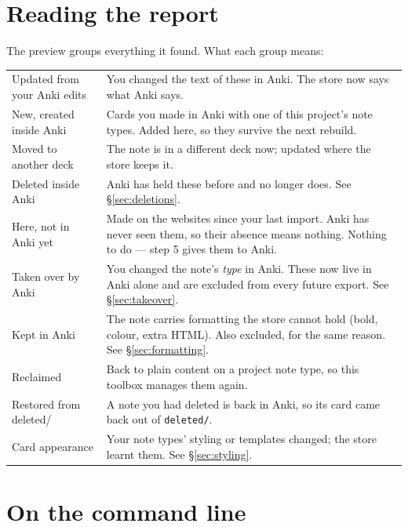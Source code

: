 \documentclass[11pt,oneside]{report}
\newcommand{\file}[1]{\texttt{#1}}
\begin{document}
\section{Reading the report}
\label{sec:report}

The preview groups everything it found. What each group means:

\begin{center}
\begin{longtable}{@{}p{}p{}@{}}
\toprule
\textsf{Updated from your Anki edits} & You changed the text of these in
  Anki. The store now says what Anki says. \\
\addlinespace
\textsf{New, created inside Anki} & Cards you made in Anki with one of this
  project's note types. Added here, so they survive the next rebuild. \\
\addlinespace
\textsf{Moved to another deck} & The note is in a different deck now;
  updated where the store keeps it. \\
\addlinespace
\textsf{Deleted inside Anki} & Anki has held these before and no longer
  does. See \S\ref{sec:deletions}. \\
\addlinespace
\textsf{Here, not in Anki yet} & Made on the websites since your last
  import. Anki has never seen them, so their absence means nothing.
  Nothing to do --- step 5 gives them to Anki. \\
\addlinespace
\textsf{Taken over by Anki} & You changed the note's \emph{type} in Anki.
  These now live in Anki alone and are excluded from every future export.
  See \S\ref{sec:takeover}. \\
\addlinespace
\textsf{Kept in Anki} & The note carries formatting the store cannot hold
  (bold, colour, extra HTML). Also excluded, for the same reason. See
  \S\ref{sec:formatting}. \\
\addlinespace
\textsf{Reclaimed} & Back to plain content on a project note type, so this
  toolbox manages them again. \\
\addlinespace
\textsf{Restored from deleted/} & A note you had deleted is back in Anki, so
  its card came back out of \file{deleted/}. \\
\addlinespace
\textsf{Card appearance} & Your note types' styling or templates changed;
  the store learnt them. See \S\ref{sec:styling}. \\
\bottomrule
\end{longtable}
\end{center}

\section{On the command line}
\end{document}
